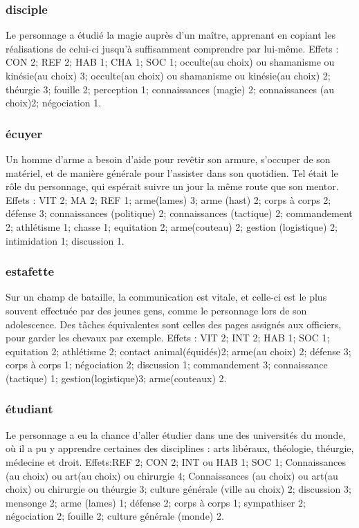 \documentclass[10pt,a4paper,twocolumn]{book}
\begin{document}
\subsubsection{disciple}
Le personnage a étudié la magie auprès d’un maître, apprenant en copiant les réalisations de celui-ci jusqu’à suffisamment comprendre par lui-même.
Effets : CON 2; REF 2; HAB 1; CHA 1; SOC 1; occulte(au choix) ou shamanisme ou kinésie(au choix) 3; occulte(au choix) ou shamanisme ou kinésie(au choix) 2; théurgie 3; fouille 2; perception 1; connaissances (magie) 2; connaissances (au choix)2; négociation 1.
\subsubsection{écuyer}
Un homme d’arme a besoin d’aide pour revêtir son armure, s’occuper de son matériel, et de manière générale pour l’assister dans son quotidien. Tel était le rôle du personnage, qui espérait suivre un jour la même route que son mentor.
Effets : VIT 2; MA 2; REF 1; arme(lames) 3; arme (hast) 2; corps à corps 2; défense 3; connaissances (politique) 2; connaissances (tactique) 2; commandement 2; athlétisme 1; chasse 1; equitation 2; arme(couteau) 2; gestion (logistique) 2; intimidation 1; discussion 1.
\subsubsection{estafette}
Sur un champ de bataille, la communication est vitale, et celle-ci est le plus souvent effectuée par des jeunes gens, comme le personnage lors de son adolescence. Des tâches équivalentes sont celles des pages assignés aux officiers, pour garder les chevaux par exemple.
Effets : VIT 2; INT 2; HAB 1; SOC 1; equitation 2; athlétisme 2; contact animal(équidés)2; arme(au choix) 2; défense 3; corps à corps 1; négociation 2; discussion 1; commandement 3; connaissance (tactique) 1; gestion(logistique)3; arme(couteaux) 2.
\subsubsection{étudiant}
Le personnage a eu la chance d’aller étudier dans une des universités du monde, où il a pu y apprendre certaines des disciplines : arts libéraux, théologie, théurgie, médecine et droit.
Effets:REF 2; CON 2; INT ou HAB 1; SOC 1; Connaissances (au choix) ou art(au choix) ou chirurgie 4; Connaissances (au choix) ou art(au choix) ou chirurgie ou théurgie 3; culture générale (ville au choix) 2; discussion 3; mensonge 2; arme (lames) 1; défense 2; corps à corps 1; sympathiser 2; négociation 2; fouille 2; culture générale (monde) 2.
\end{document}
